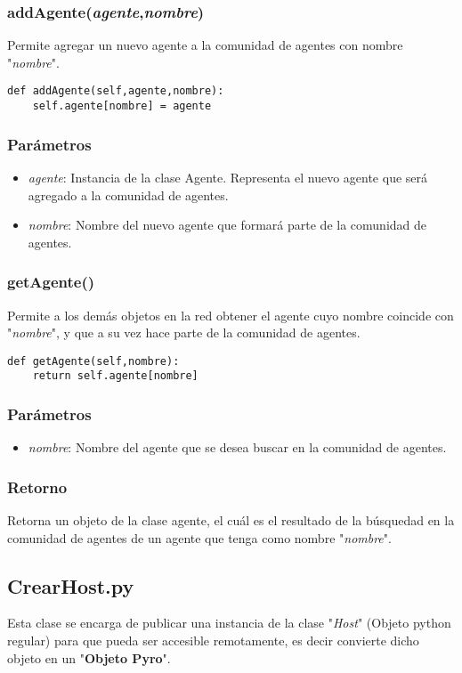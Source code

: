 \documentclass{article}
\begin{document}
\subsubsection{\textbf{addAgente}(\textit{agente},\textit{nombre})}
Permite agregar un nuevo agente a la comunidad de agentes con nombre "\textit{nombre}".
\begin{lstlisting}
def addAgente(self,agente,nombre):
	self.agente[nombre] = agente
\end{lstlisting}
\subsubsection*{Parámetros}
\begin{itemize}
\item \textit{agente}: Instancia de la clase Agente. Representa el nuevo agente que será agregado a la comunidad de agentes.
\item \textit{nombre}: Nombre del nuevo agente que formará parte de la comunidad de agentes.
\end{itemize}
\subsubsection{\textbf{getAgente}()}
Permite a los demás objetos en la red obtener el agente cuyo nombre coincide con "\textit{nombre}", y que a su vez hace parte de la comunidad de agentes.
\begin{lstlisting}
def getAgente(self,nombre):
    return self.agente[nombre]
\end{lstlisting}
\subsubsection*{Parámetros}
\begin{itemize}
\item \textit{nombre}: Nombre del agente que se desea buscar en la comunidad de agentes.
\end{itemize}
\subsubsection*{Retorno}
Retorna un objeto de la clase agente, el cuál es el resultado de la búsquedad en la comunidad de agentes de un agente que tenga como nombre "\textit{nombre}".
\subsection{CrearHost.py}
Esta clase se encarga de publicar una instancia de la clase "\textit{Host}" (Objeto python regular) para que pueda ser accesible remotamente, es decir convierte dicho objeto en un "\textbf{Objeto Pyro}".\\
\end{document}
